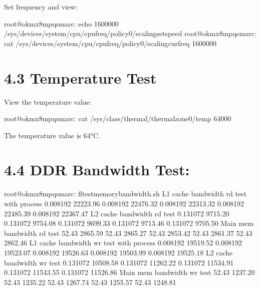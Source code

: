 \documentclass[letterpaper,10pt,openany,english]{sphinxmanual}
\begin{document}
\sphinxAtStartPar
Set frequency and view:

\begin{sphinxVerbatim}[commandchars=\\\{\}]
root@ok\PYGZhy{}mx8mpq\PYGZhy{}smarc:\PYGZti{}\PYGZsh{} echo 1600000 \PYGZgt{} \PYGZbs{}
/sys/devices/system/cpu/cpufreq/policy0/scaling\PYGZus{}setspeed
root@ok\PYGZhy{}mx8mpq\PYGZhy{}smarc:\PYGZti{}\PYGZsh{} cat /sys/devices/system/cpu/cpufreq/policy0/scaling\PYGZus{}cur\PYGZus{}freq
1600000
\end{sphinxVerbatim}


\section{4.3 Temperature Test}
\label{\detokenize{linux-manual:temperature-test}}
\sphinxAtStartPar
View the temperature value:

\begin{sphinxVerbatim}[commandchars=\\\{\}]
root@ok\PYGZhy{}mx8mpq\PYGZhy{}smarc:\PYGZti{}\PYGZsh{} cat /sys/class/thermal/thermal\PYGZus{}zone0/temp
64000
\end{sphinxVerbatim}

\sphinxAtStartPar
The temperature value is 64°C.


\section{4.4 DDR Bandwidth Test:}
\label{\detokenize{linux-manual:ddr-bandwidth-test}}
\begin{sphinxVerbatim}[commandchars=\\\{\}]
root@ok\PYGZhy{}mx8mpq\PYGZhy{}smarc:\PYGZti{}\PYGZsh{} fltest\PYGZus{}memory\PYGZus{}bandwidth.sh
L1 cache bandwidth rd test with \PYGZsh{} process
0.008192 22223.96
0.008192 22476.32
0.008192 22313.32
0.008192 22485.39
0.008192 22367.47
L2 cache bandwidth rd test
0.131072 9715.20
0.131072 9754.08
0.131072 9699.33
0.131072 9713.46
0.131072 9705.50
Main mem bandwidth rd test
52.43 2865.59
52.43 2865.27
52.43 2853.42
52.43 2861.37
52.43 2862.46
L1 cache bandwidth wr test with \PYGZsh{} process
0.008192 19519.52
0.008192 19523.07
0.008192 19526.63
0.008192 19503.99
0.008192 19525.18
L2 cache bandwidth wr test
0.131072 10508.58
0.131072 11262.22
0.131072 11534.91
0.131072 11543.55
0.131072 11526.86
Main mem bandwidth wr test
52.43 1237.20
52.43 1235.22
52.43 1267.74
52.43 1255.57
52.43 1248.81
\end{sphinxVerbatim}
\end{document}

